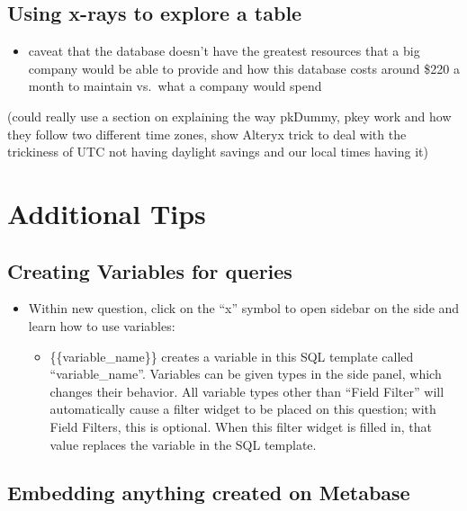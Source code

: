 \documentclass[]{book}
\providecommand{\tightlist}{%
  \setlength{\itemsep}{0pt}\setlength{\parskip}{0pt}}
\begin{document}
\hypertarget{using-x-rays-to-explore-a-table}{%
\section{Using x-rays to explore a table}\label{using-x-rays-to-explore-a-table}}

\begin{itemize}
\tightlist
\item
  caveat that the database doesn't have the greatest resources that a big company would be able to provide and how this database costs around \$220 a month to maintain vs.~what a company would spend
\end{itemize}

(could really use a section on explaining the way pkDummy, pkey work and how they follow two different time zones, show Alteryx trick to deal with the trickiness of UTC not having daylight savings and our local times having it)

\hypertarget{additional-tips}{%
\chapter{Additional Tips}\label{additional-tips}}

\hypertarget{creating-variables-for-queries}{%
\section{Creating Variables for queries}\label{creating-variables-for-queries}}

\begin{itemize}
\item
  Within new question, click on the ``x'' symbol to open sidebar on the side and learn how to use variables:

  \begin{itemize}
  \tightlist
  \item
    \{\{variable\_name\}\} creates a variable in this SQL template called ``variable\_name''. Variables can be given types in the side panel, which changes their behavior. All variable types other than ``Field Filter'' will automatically cause a filter widget to be placed on this question; with Field Filters, this is optional. When this filter widget is filled in, that value replaces the variable in the SQL template.
  \end{itemize}
\end{itemize}

\hypertarget{embedding-anything-created-on-metabase}{%
\section{Embedding anything created on Metabase}\label{embedding-anything-created-on-metabase}}
\end{document}
